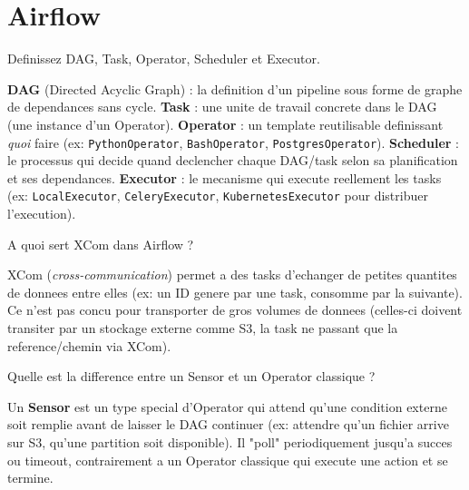 \documentclass[11pt,a4paper]{article}
\begin{document}
\newpage
\section{Airflow}

\begin{question} Definissez DAG, Task, Operator, Scheduler et Executor.
\end{question}
\begin{reponse}
\textbf{DAG} (Directed Acyclic Graph) : la definition d'un pipeline sous forme de graphe de dependances sans cycle. \textbf{Task} : une unite de travail concrete dans le DAG (une instance d'un Operator). \textbf{Operator} : un template reutilisable definissant \emph{quoi} faire (ex: \texttt{PythonOperator}, \texttt{BashOperator}, \texttt{PostgresOperator}). \textbf{Scheduler} : le processus qui decide quand declencher chaque DAG/task selon sa planification et ses dependances. \textbf{Executor} : le mecanisme qui execute reellement les tasks (ex: \texttt{LocalExecutor}, \texttt{CeleryExecutor}, \texttt{KubernetesExecutor} pour distribuer l'execution).
\end{reponse}

\begin{question} A quoi sert XCom dans Airflow ?
\end{question}
\begin{reponse}
XCom (\emph{cross-communication}) permet a des tasks d'echanger de petites quantites de donnees entre elles (ex: un ID genere par une task, consomme par la suivante). Ce n'est pas concu pour transporter de gros volumes de donnees (celles-ci doivent transiter par un stockage externe comme S3, la task ne passant que la reference/chemin via XCom).
\end{reponse}

\begin{question} Quelle est la difference entre un Sensor et un Operator classique ?
\end{question}
\begin{reponse}
Un \textbf{Sensor} est un type special d'Operator qui attend qu'une condition externe soit remplie avant de laisser le DAG continuer (ex: attendre qu'un fichier arrive sur S3, qu'une partition soit disponible). Il "poll" periodiquement jusqu'a succes ou timeout, contrairement a un Operator classique qui execute une action et se termine.
\end{reponse}
\end{document}

